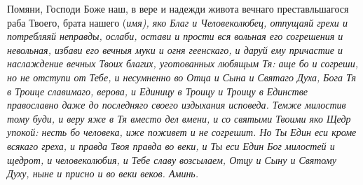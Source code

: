 \mychapterending

 


Помяни, Господи Боже наш, в вере и надежди живота вечнаго преставльшагося раба Твоего, брата нашего (\itshape имя\normalfont{}), яко Благ и Человеколюбец, отпущаяй грехи и потребляяй неправды, ослаби, остави и прости вся вольная его согрешения и невольная, избави его вечныя муки и огня геенскаго, и даруй ему причастие и наслаждение вечных Твоих благих, уготованных любящым Тя: аще бо и согреши, но не отступи от Тебе, и несумненно во Отца и Сына и Святаго Духа, Бога Тя в Троице славимаго, верова, и Единицу в Троицу и Троицу в Единстве православно даже до последняго своего издыхания исповеда. Темже милостив тому буди, и веру яже в Тя вместо дел вмени, и со святыми Твоими яко Щедр упокой: несть бо человека, иже поживет и не согрешит. Но Ты Един еси кроме всякаго греха, и правда Твоя правда во веки, и Ты еси Един Бог милостей и щедрот, и человеколюбия, и Тебе славу возсылаем, Отцу и Сыну и Святому Духу, ныне и присно и во веки веков. Аминь. 


\mychapterending

 


